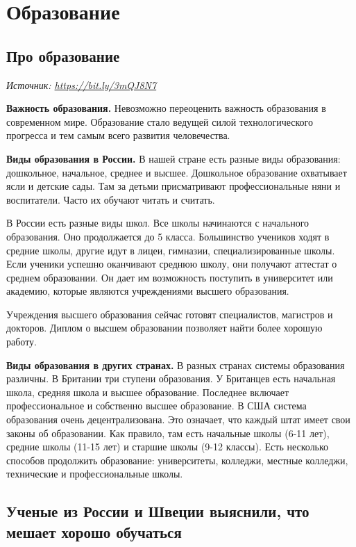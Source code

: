 \chapter{Образование}

\section{Про образование}

\textit{Источник: \url{https://bit.ly/3mQJ8N7}}

\textbf{Важность образования.}
Невозможно переоценить важность образования в современном мире. Образование стало ведущей силой технологического прогресса и тем самым всего развития человечества.

\textbf{Виды образования в России.}
В нашей стране есть разные виды образования: дошкольное, начальное, среднее и высшее.
Дошкольное образование охватывает ясли и детские сады. Там за детьми присматривают профессиональные няни и воспитатели. Часто их обучают читать и считать.

В России есть разные виды школ. Все школы начинаются с начального образования. Оно продолжается до 5 класса. Большинство учеников ходят в средние школы, другие идут в лицеи, гимназии, специализированные школы. Если ученики успешно оканчивают среднюю школу, они получают аттестат о среднем образовании. Он дает им возможность поступить в университет или академию, которые являются учреждениями высшего образования.

Учреждения высшего образования сейчас готовят специалистов, магистров и докторов. Диплом о высшем образовании позволяет найти более хорошую работу.

\textbf{Виды образования в других странах.}
В разных странах системы образования различны. В Британии три ступени образования. У Британцев есть начальная школа, средняя школа и высшее образование. Последнее включает профессиональное и собственно высшее образование.
В США система образования очень децентрализована. Это означает, что каждый штат имеет свои законы об образовании. Как правило, там есть начальные школы (6-11 лет), средние школы (11-15 лет) и старшие школы (9-12 классы). Есть несколько способов продолжить образование: университеты, колледжи, местные колледжи, технические и профессиональные школы.

\clearpage
\section[Что мешает хорошо обучаться]{Ученые из России и Швеции выяснили, что мешает хорошо обучаться}

